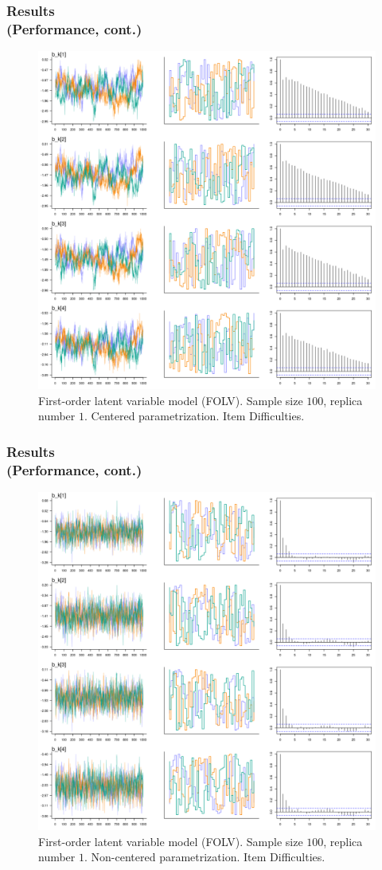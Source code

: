 \documentclass[nonav,sleutel]{beamer}
\begin{document}
	\begin{frame}
		\frametitle{Results \\
			(Performance, cont.)}
		\begin{figure}[H]
			\centering
			\includegraphics[width=0.60\linewidth]{FOLV_CE_J100_Ndata1_bk1}
			\caption{First-order latent variable model (FOLV). Sample size $100$, replica number $1$. Centered parametrization. Item Difficulties.}
			\label{fig:FOLV_CE_chains3}
		\end{figure} 
	\end{frame}
	\begin{frame}
		\frametitle{Results \\
			(Performance, cont.)}
		\begin{figure}[H]
			\centering
			\includegraphics[width=0.60\linewidth]{FOLV_NC_J100_Ndata1_bk1}
			\caption{First-order latent variable model (FOLV). Sample size $100$, replica number $1$. Non-centered parametrization. Item Difficulties.}
			\label{fig:FOLV_NC_chains3}
		\end{figure} 
	\end{frame}
\end{document}

